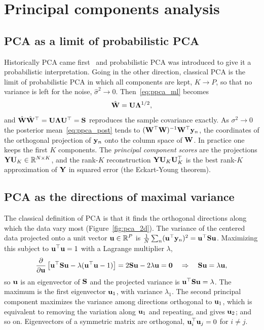 \section{Principal components analysis}
\label{sec:pca}

\subsection{PCA as a limit of probabilistic PCA}

Historically PCA came first~\citep{pearson1901,hotelling1933} and probabilistic PCA was introduced to give it a probabilistic interpretation. Going in the other direction, classical PCA is the limit of probabilistic PCA in which all components are kept, $K\to P$, so that no variance is left for the noise, $\hat\sigma^2\to0$. Then~\eqref{eq:ppca_ml} becomes
\begin{equation}
  \hat{\mathbf{W}}=\mathbf{U}\boldsymbol{\Lambda}^{1/2},
\end{equation}
and $\hat{\mathbf{W}}\hat{\mathbf{W}}^\top=\mathbf{U}\boldsymbol{\Lambda}\mathbf{U}^\top=\mathbf{S}$ reproduces the sample covariance exactly. As $\sigma^2\to0$ the posterior mean~\eqref{eq:ppca_post} tends to $(\mathbf{W}^\top\mathbf{W})^{-1}\mathbf{W}^\top\mathbf{y}_n$, the coordinates of the orthogonal projection of $\mathbf{y}_n$ onto the column space of $\mathbf{W}$. In practice one keeps the first $K$ components. The \emph{principal component scores} are the projections $\mathbf{Y}\mathbf{U}_K\in\mathbb{R}^{N\times K}$, and the rank-$K$ reconstruction $\mathbf{Y}\mathbf{U}_K\mathbf{U}_K^\top$ is the best rank-$K$ approximation of $\mathbf{Y}$ in squared error (the Eckart-Young theorem).

\subsection{PCA as the directions of maximal variance}

The classical definition of PCA is that it finds the orthogonal directions along which the data vary most (Figure~\ref{fig:pca_2d}). The variance of the centered data projected onto a unit vector $\mathbf{u}\in\mathbb{R}^P$ is $\frac1N\sum_n(\mathbf{u}^\top\mathbf{y}_n)^2=\mathbf{u}^\top\mathbf{S}\mathbf{u}$. Maximizing this subject to $\mathbf{u}^\top\mathbf{u}=1$ with a Lagrange multiplier $\lambda$,
\begin{equation}
  \frac{\partial}{\partial\mathbf{u}}\left[\mathbf{u}^\top\mathbf{S}\mathbf{u}-\lambda(\mathbf{u}^\top\mathbf{u}-1)\right]=2\mathbf{S}\mathbf{u}-2\lambda\mathbf{u}=\mathbf{0}
  \quad\Rightarrow\quad \mathbf{S}\mathbf{u}=\lambda\mathbf{u},
\end{equation}
so $\mathbf{u}$ is an eigenvector of $\mathbf{S}$ and the projected variance is $\mathbf{u}^\top\mathbf{S}\mathbf{u}=\lambda$. The maximum is the first eigenvector $\mathbf{u}_1$, with variance $\lambda_1$. The second principal component maximizes the variance among directions orthogonal to $\mathbf{u}_1$, which is equivalent to removing the variation along $\mathbf{u}_1$ and repeating, and gives $\mathbf{u}_2$; and so on. Eigenvectors of a symmetric matrix are orthogonal, $\mathbf{u}_i^\top\mathbf{u}_j=0$ for $i\neq j$.

